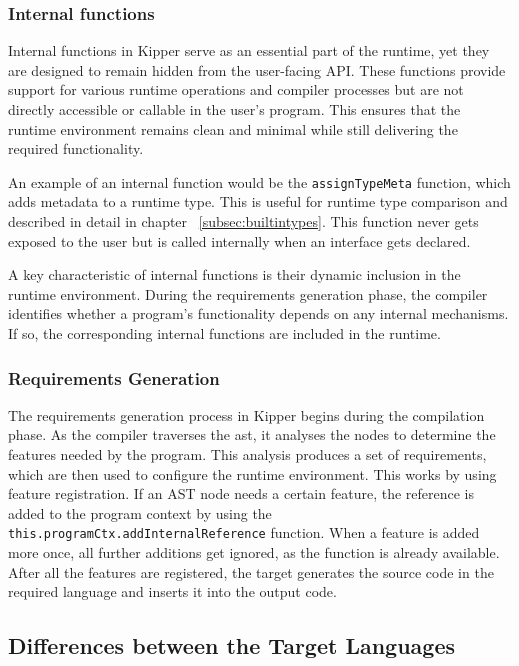 \subsubsection{Internal functions}

Internal functions in Kipper serve as an essential part of the runtime, yet they are designed to remain hidden from the user-facing API. These functions provide support for various runtime operations and compiler processes but are not directly accessible or callable in the user's program. This ensures that the runtime environment remains clean and minimal while still delivering the required functionality.

An example of an internal function would be the \lstinline|assignTypeMeta| function, which adds metadata to a runtime type. This is useful for runtime type comparison and described in detail in chapter ~\ref{subsec:builtintypes}. This function never gets exposed to the user but is called internally when an interface gets declared.

A key characteristic of internal functions is their dynamic inclusion in the runtime environment. During the requirements generation phase, the compiler identifies whether a program's functionality depends on any internal mechanisms. If so, the corresponding internal functions are included in the runtime.

\subsubsection{Requirements Generation}

The requirements generation process in Kipper begins during the compilation phase. As the compiler traverses the \acrshort{ast}, it analyses the nodes to determine the features needed by the program. This analysis produces a set of requirements, which are then used to configure the runtime environment. This works by using feature registration. If an AST node needs a certain feature, the reference is added to the program context by using the \lstinline|this.programCtx.addInternalReference| function. When a feature is added more once, all further additions get ignored, as the function is already available. After all the features are registered, the target generates the source code in the required language and inserts it into the output code.

\subsection{Differences between the Target Languages}

